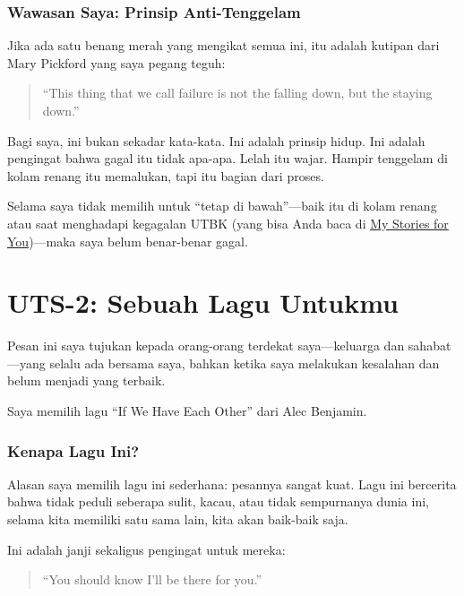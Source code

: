 \documentclass[
  letterpaper,
  DIV=11,
  numbers=noendperiod]{scrreprt}
\begin{document}
\subsection{Wawasan Saya: Prinsip
Anti-Tenggelam}\label{wawasan-saya-prinsip-anti-tenggelam}

Jika ada satu benang merah yang mengikat semua ini, itu adalah kutipan
dari Mary Pickford yang saya pegang teguh:

\begin{quote}
``This thing that we call failure is not the falling down, but the
staying down.''
\end{quote}

Bagi saya, ini bukan sekadar kata-kata. Ini adalah prinsip hidup. Ini
adalah pengingat bahwa gagal itu tidak apa-apa. Lelah itu wajar. Hampir
tenggelam di kolam renang itu memalukan, tapi itu bagian dari proses.

Selama saya tidak memilih untuk ``tetap di bawah''---baik itu di kolam
renang atau saat menghadapi kegagalan UTBK (yang bisa Anda baca di
\href{../My_Stories_for_You/index.qmd}{My Stories for You})---maka saya
belum benar-benar gagal.


\chapter{UTS-2: Sebuah Lagu Untukmu}\label{uts-2-sebuah-lagu-untukmu}

Pesan ini saya tujukan kepada orang-orang terdekat saya---keluarga dan
sahabat---yang selalu ada bersama saya, bahkan ketika saya melakukan
kesalahan dan belum menjadi yang terbaik.

Saya memilih lagu ``If We Have Each Other'' dari Alec Benjamin.

\subsection{Kenapa Lagu Ini?}\label{kenapa-lagu-ini}

Alasan saya memilih lagu ini sederhana: pesannya sangat kuat. Lagu ini
bercerita bahwa tidak peduli seberapa sulit, kacau, atau tidak
sempurnanya dunia ini, selama kita memiliki satu sama lain, kita akan
baik-baik saja.

Ini adalah janji sekaligus pengingat untuk mereka:

\begin{quote}
``You should know I'll be there for you.''
\end{quote}
\end{document}
